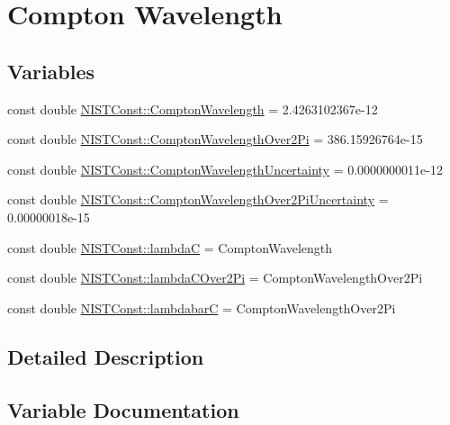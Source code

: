 \hypertarget{group___compton_wavelength}{}\section{Compton Wavelength}
\label{group___compton_wavelength}
\subsection*{Variables}
\begin{DoxyCompactItemize}
\item 
const double \hyperlink{group___compton_wavelength_ga6f9b597d657bd3e9add13a76516cbabc}{N\+I\+S\+T\+Const\+::\+Compton\+Wavelength} = 2.\+4263102367e-\/12
\item 
const double \hyperlink{group___compton_wavelength_ga5031f85750fecb545f0353cb05bb7c69}{N\+I\+S\+T\+Const\+::\+Compton\+Wavelength\+Over2\+Pi} = 386.\+15926764e-\/15
\item 
const double \hyperlink{group___compton_wavelength_ga4845f956ea0bf6f4eaf7396173b09430}{N\+I\+S\+T\+Const\+::\+Compton\+Wavelength\+Uncertainty} = 0.\+0000000011e-\/12
\item 
const double \hyperlink{group___compton_wavelength_ga900f59720b26696c75d2ce455d686a57}{N\+I\+S\+T\+Const\+::\+Compton\+Wavelength\+Over2\+Pi\+Uncertainty} = 0.\+00000018e-\/15
\item 
const double \hyperlink{group___compton_wavelength_gae311e27b1f359b90efb6895ddf388a80}{N\+I\+S\+T\+Const\+::lambdaC} = Compton\+Wavelength
\item 
const double \hyperlink{group___compton_wavelength_gadaf3906a9db23eece3ac4e130978a8ce}{N\+I\+S\+T\+Const\+::lambda\+C\+Over2\+Pi} = Compton\+Wavelength\+Over2\+Pi
\item 
const double \hyperlink{group___compton_wavelength_gaeed48ca7330a4ba9227043237fed90f9}{N\+I\+S\+T\+Const\+::lambdabarC} = Compton\+Wavelength\+Over2\+Pi
\end{DoxyCompactItemize}


\subsection{Detailed Description}


\subsection{Variable Documentation}
\mbox{\label{group___compton_wavelength_ga6f9b597d657bd3e9add13a76516cbabc}} 
